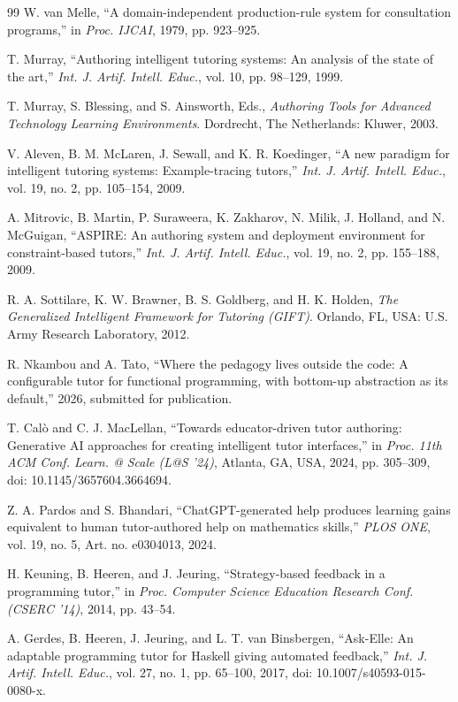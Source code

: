 \documentclass[journal]{IEEEtran}
\begin{document}
\begin{thebibliography}{99}
W. van Melle, ``A domain-independent production-rule system for
consultation programs,'' in \emph{Proc. IJCAI}, 1979, pp. 923--925.

T. Murray, ``Authoring intelligent tutoring systems: An analysis
of the state of the art,'' \emph{Int. J. Artif. Intell. Educ.}, vol. 10, pp. 98--129, 1999.

T. Murray, S. Blessing, and S. Ainsworth, Eds., \emph{Authoring
Tools for Advanced Technology Learning Environments}. Dordrecht, The
Netherlands: Kluwer, 2003.

V. Aleven, B. M. McLaren, J. Sewall, and K. R. Koedinger, ``A
new paradigm for intelligent tutoring systems: Example-tracing tutors,''
\emph{Int. J. Artif. Intell. Educ.}, vol. 19, no. 2,
pp. 105--154, 2009.

A. Mitrovic, B. Martin, P. Suraweera, K. Zakharov, N. Milik, J.
Holland, and N. McGuigan, ``ASPIRE: An authoring system and deployment
environment for constraint-based tutors,'' \emph{Int. J. Artif. Intell. Educ.}, vol. 19, no. 2, pp. 155--188, 2009.

R. A. Sottilare, K. W. Brawner, B. S. Goldberg, and H. K.
Holden, \emph{The Generalized Intelligent Framework for Tutoring
(GIFT)}. Orlando, FL, USA: U.S. Army Research Laboratory, 2012.

R. Nkambou and A. Tato, ``Where the pedagogy lives outside the
code: A configurable tutor for functional programming, with bottom-up
abstraction as its default,'' 2026, submitted for publication.

T. Cal\`o and C. J. MacLellan, ``Towards educator-driven tutor
authoring: Generative AI approaches for creating intelligent tutor
interfaces,'' in \emph{Proc. 11th ACM Conf. Learn. @ Scale (L@S '24)},
Atlanta, GA, USA, 2024, pp. 305--309, doi: 10.1145/3657604.3664694.

Z. A. Pardos and S. Bhandari, ``ChatGPT-generated help produces
learning gains equivalent to human tutor-authored help on mathematics
skills,'' \emph{PLOS ONE}, vol. 19, no. 5, Art. no. e0304013, 2024.

H. Keuning, B. Heeren, and J. Jeuring, ``Strategy-based feedback in
a programming tutor,'' in \emph{Proc. Computer Science Education Research
Conf. (CSERC '14)}, 2014, pp. 43--54.

A. Gerdes, B. Heeren, J. Jeuring, and L. T. van Binsbergen,
``Ask-Elle: An adaptable programming tutor for Haskell giving automated
feedback,'' \emph{Int. J. Artif. Intell. Educ.}, vol. 27, no. 1,
pp. 65--100, 2017, doi: 10.1007/s40593-015-0080-x.


\end{thebibliography}
\end{document}
